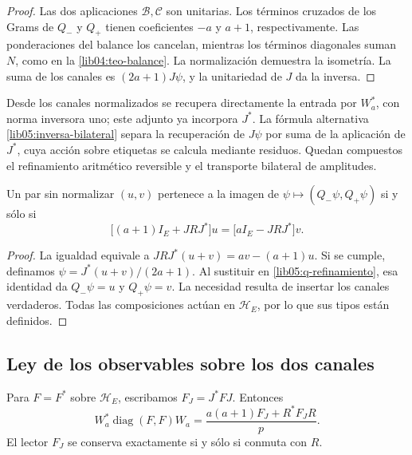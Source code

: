 \begin{proof}
Las dos aplicaciones \(\mathcal B,\mathcal C\) son unitarias.
Los términos cruzados de los Grams de \(Q_-\) y \(Q_+\) tienen
coeficientes \(-a\) y \(a+1\), respectivamente. Las ponderaciones
del balance los cancelan, mientras los términos diagonales suman
\(N\), como en la \cref{lib04:teo-balance}. La normalización
demuestra la isometría. La suma de los canales es
\((2a+1)J\psi\), y la unitariedad de \(J\) da la inversa.
\end{proof}

Desde los canales normalizados se recupera directamente la entrada
por \(W_a^*\), con norma inversora uno; este adjunto ya incorpora
\(J^*\). La fórmula alternativa
\eqref{lib05:inversa-bilateral} separa la recuperación de \(J\psi\)
por suma de la aplicación de \(J^*\), cuya acción sobre etiquetas
se calcula mediante residuos. Quedan compuestos el refinamiento
aritmético reversible y el transporte bilateral de amplitudes.

\begin{proposition}
\label{lib05:prop-compatibilidad}
Un par sin normalizar \((u,v)\) pertenece a la imagen de
\(\psi\mapsto(Q_-\psi,Q_+\psi)\) si y sólo si
\begin{equation}
 \bigl[(a+1)I_E+JRJ^*\bigr]u
 =\bigl[aI_E-JRJ^*\bigr]v.
 \label{lib05:compatibilidad}
\end{equation}
\end{proposition}

\begin{proof}
La igualdad equivale a
\(JRJ^*(u+v)=av-(a+1)u\). Si se cumple, definamos
\(\psi=J^*(u+v)/(2a+1)\). Al sustituir en
\eqref{lib05:q-refinamiento}, esa identidad da
\(Q_-\psi=u\) y \(Q_+\psi=v\). La necesidad resulta de
insertar los canales verdaderos. Todas las composiciones actúan
en \(\mathscr H_E\), por lo que sus tipos están definidos.
\end{proof}

\subsection{Ley de los observables sobre los dos canales}
\label{lib05:ley-lectores}

\begin{theorem}
\label{lib05:teo-lector}
Para \(F=F^*\) sobre \(\mathscr H_E\), escribamos
\(F_J=J^*FJ\). Entonces
\begin{equation}
 W_a^*\operatorname{diag}(F,F)W_a
 =\frac{a(a+1)F_J+R^*F_JR}{p}.
 \label{lib05:lector-bilateral}
\end{equation}
El lector \(F_J\) se conserva exactamente si y sólo si conmuta
con \(R\).
\end{theorem}

